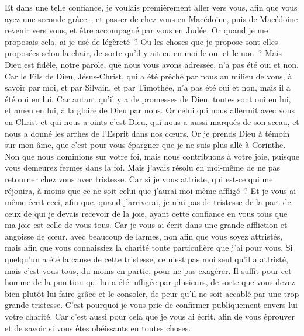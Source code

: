 \begin{multicols}{2}
Et dans une telle confiance, je voulais premièrement aller vers vous, afin que vous ayez une seconde grâce~;
et passer de chez vous en Macédoine, puis de Macédoine revenir vers vous, et être accompagné par vous en Judée.
Or quand je me proposais cela, ai-je usé de légèreté~? Ou les choses que je propose sont-elles proposées selon la chair, de sorte qu'il y ait eu en moi le oui et le non~?
Mais Dieu est fidèle, notre parole, que nous vous avons adressée, n'a pas été oui et non.
Car le Fils de Dieu, Jésus-Christ, qui a été prêché par nous au milieu de vous, à savoir par moi, et par Silvain, et par Timothée, n'a pas été oui et non, mais il a été oui en lui.
Car autant qu'il y a de promesses de Dieu, toutes sont oui en lui, et amen en lui, à la gloire de Dieu par nous.
Or celui qui nous affermit avec vous en Christ et qui nous a oints c'est Dieu,
qui nous a aussi marqués de son sceau, et nous a donné les arrhes de l'Esprit dans nos cœurs.
Or je prends Dieu à témoin sur mon âme, que c'est pour vous épargner que je ne suis plus allé à Corinthe.
Non que nous dominions sur votre foi, mais nous contribuons à votre joie, puisque vous demeurez fermes dans la foi.
\VerseOne{}Mais j'avais résolu en moi-même de ne pas retourner chez vous avec tristesse.
Car si je vous attriste, qui est-ce qui me réjouira, à moins que ce ne soit celui que j'aurai moi-même affligé~?
Et je vous ai même écrit ceci, afin que, quand j'arriverai, je n'ai pas de tristesse de la part de ceux de qui je devais recevoir de la joie, ayant cette confiance en vous tous que ma joie est celle de vous tous.
Car je vous ai écrit dans une grande affliction et angoisse de cœur, avec beaucoup de larmes, non afin que vous soyez attristés, mais afin que vous connaissiez la charité toute particulière que j'ai pour vous.
Si quelqu'un a été la cause de cette tristesse, ce n'est pas moi seul qu'il a attristé, mais c'est vous tous, du moins en partie, pour ne pas exagérer.
Il suffit pour cet homme de la punition qui lui a été infligée par plusieurs,
de sorte que vous devez bien plutôt lui faire grâce et le consoler, de peur qu'il ne soit accablé par une trop grande tristesse.
C'est pourquoi je vous prie de confirmer publiquement envers lui votre charité.
Car c'est aussi pour cela que je vous ai écrit, afin de vous éprouver et de savoir si vous êtes obéissants en toutes choses.

\end{multicols}
